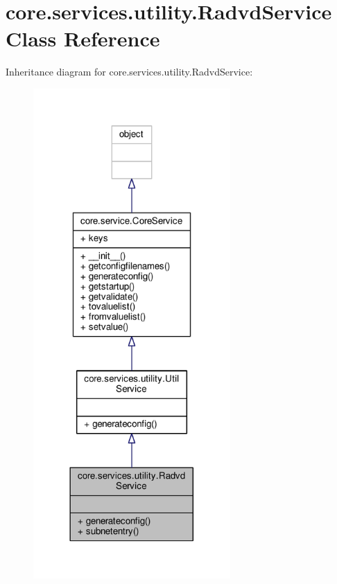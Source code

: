 \hypertarget{classcore_1_1services_1_1utility_1_1_radvd_service}{\section{core.\+services.\+utility.\+Radvd\+Service Class Reference}
\label{classcore_1_1services_1_1utility_1_1_radvd_service}
}


Inheritance diagram for core.\+services.\+utility.\+Radvd\+Service\+:
\nopagebreak
\begin{figure}[H]
\begin{center}
\leavevmode
\includegraphics[width=213pt]{classcore_1_1services_1_1utility_1_1_radvd_service__inherit__graph}
\end{center}
\end{figure}


